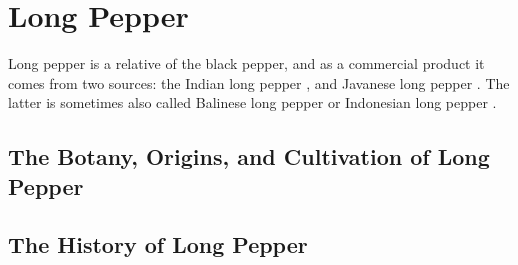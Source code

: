 \section{Long Pepper}
\label{sec:long_pepper}

Long pepper is a relative of the black pepper, and as a commercial product it comes from two sources: the Indian long pepper , and Javanese long pepper . The latter is sometimes also called Balinese long pepper or Indonesian long pepper .


\subsection{The Botany, Origins, and Cultivation of Long Pepper}

\subsection{The History of Long Pepper}

